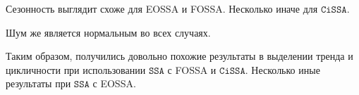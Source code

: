 \documentclass[12pt, specialist, subf
]{disser}
\theoremstyle{definition}
\newcommand{\SSA}{\texttt{SSA}}
\newcommand{\CISSA}{\texttt{CiSSA}}
\newcommand{\MSSA}{\texttt{MSSA}}
\newcommand{\DSSA}{\texttt{2d-SSA}}
\newcommand{\TS}{\mathsf{X}}
\begin{document}
Сезонность выглядит схоже для EOSSA и FOSSA. Несколько иначе для $\CISSA$.

Шум же является нормальным во всех случаях.




Таким образом, получились довольно похожие результаты в выделении тренда и цикличности при использовании $\SSA$ с FOSSA и $\CISSA$. Несколько иные результаты при $\SSA$ с EOSSA.

\newpage









\end{document}
